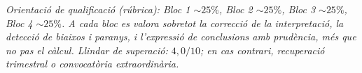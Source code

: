 \noindent\small\textit{Orientació de qualificació (rúbrica): Bloc 1 $\sim 25\%$,
Bloc 2 $\sim 25\%$, Bloc 3 $\sim 25\%$, Bloc 4 $\sim 25\%$. A cada bloc es valora sobretot la
correcció de la interpretació, la detecció de biaixos i paranys, i l'expressió de
conclusions amb prudència, més que no pas el càlcul. Llindar de superació: $4,0/10$; en cas
contrari, recuperació trimestral o convocatòria extraordinària.}
